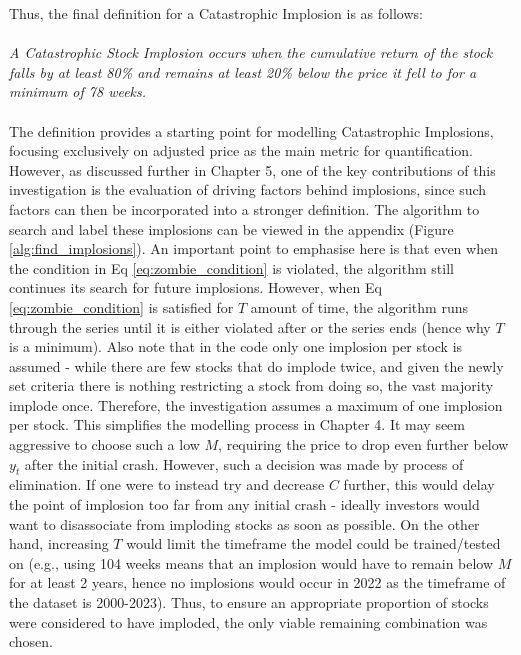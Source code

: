 \documentclass[a4paper]{report}
\begin{document}
Thus, the final definition for a Catastrophic Implosion is as follows:\\\\
\textit{A Catastrophic Stock Implosion occurs when the cumulative return of the stock falls by at least 80\% and remains at least 20\% below the price it fell to for a minimum of 78 weeks.}
\\\\The definition provides a starting point for modelling Catastrophic Implosions, focusing exclusively on adjusted price as the main metric for quantification. However, as discussed further in Chapter 5, one of the key contributions of this 
investigation is the evaluation of driving factors behind implosions, since such factors can then be incorporated into a stronger definition. The algorithm to search and label these implosions 
can be viewed in the appendix (Figure \ref{alg:find_implosions}). An important point to emphasise here is that even when the condition 
in Eq \ref{eq:zombie_condition} is violated, the algorithm still continues its search for future implosions. However, when Eq \ref{eq:zombie_condition} is satisfied for \(T\) amount of time, the algorithm 
runs through the series until it is either violated after or the series ends (hence why \(T\) is a minimum). Also note that in the code only one implosion per stock is assumed - while there are few stocks that do implode twice, and given the newly set criteria there is nothing 
restricting a stock from doing so, the vast majority implode once. Therefore, the investigation assumes a maximum of one implosion per stock. This simplifies the modelling process in Chapter 4. 
It may seem aggressive to choose such a low \(M\), requiring the price to drop even further below \(y_{\hat{t}}\) after the initial crash. However, such 
a decision was made by process of elimination. If one were to instead try and decrease \(C\) further, this would delay the point of implosion too far from any initial crash - ideally investors 
would want to disassociate from imploding stocks as soon as possible. On the other hand, increasing \(T\) would limit the timeframe the model could be trained/tested on (e.g., using 104 weeks means that an implosion would have to remain below \(M\) for at least 2 years, 
hence no implosions would occur in 2022 as the timeframe of the dataset is 2000-2023). Thus, to ensure an appropriate proportion of stocks were considered to have imploded, the only viable remaining combination was chosen.
\end{document}
